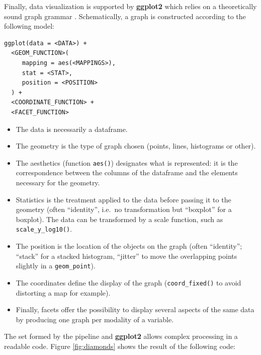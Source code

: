 \documentclass[
  12pt,
  american,
  a4paper,
  extrafontsizes,onecolumn,openright
  ]{memoir}
\providecommand{\tightlist}{%
  \setlength{\itemsep}{0pt}\setlength{\parskip}{0pt}}
\begin{document}
Finally, data visualization is supported by \textbf{ggplot2} which relies on a theoretically sound graph grammar \autocite{Wickham2010}.
Schematically, a graph is constructed according to the following model:

\begin{verbatim}
ggplot(data = <DATA>) + 
  <GEOM_FUNCTION>(
     mapping = aes(<MAPPINGS>),
     stat = <STAT>, 
     position = <POSITION>
  ) +
  <COORDINATE_FUNCTION> +
  <FACET_FUNCTION>
\end{verbatim}

\begin{itemize}
\tightlist
\item
  The data is necessarily a dataframe.
\item
  The geometry is the type of graph chosen (points, lines, histograms or other).
\item
  The aesthetics (function \texttt{aes()}) designates what is represented: it is the correspondence between the columns of the dataframe and the elements necessary for the geometry.
\item
  Statistics is the treatment applied to the data before passing it to the geometry (often \enquote{identity}, i.e.~no transformation but \enquote{boxplot} for a boxplot).
  The data can be transformed by a scale function, such as \texttt{scale\_y\_log10()}.
\item
  The position is the location of the objects on the graph (often \enquote{identity}; \enquote{stack} for a stacked histogram, \enquote{jitter} to move the overlapping points slightly in a \texttt{geom\_point}).
\item
  The coordinates define the display of the graph (\texttt{coord\_fixed()} to avoid distorting a map for example).
\item
  Finally, facets offer the possibility to display several aspects of the same data by producing one graph per modality of a variable.
\end{itemize}

The set formed by the pipeline and \textbf{ggplot2} allows complex processing in a readable code.
Figure \ref{fig:diamonds} shows the result of the following code:



\scriptsize
\end{document}
